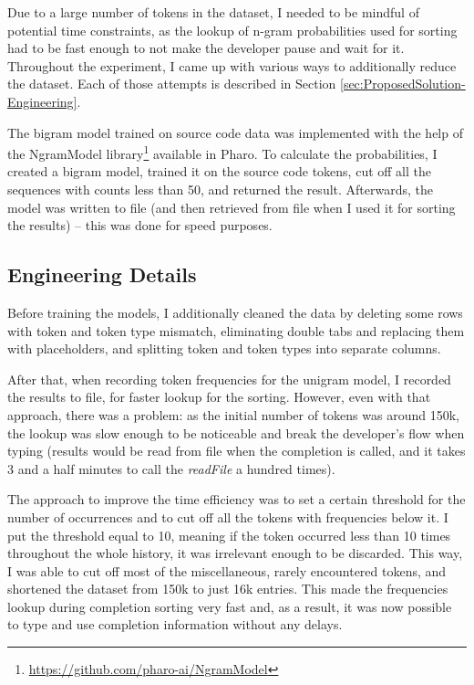 \documentclass[sigplan,screen]{acmart}
\begin{document}
Due to a large number of tokens in the dataset, I needed to be mindful of potential time constraints, as the lookup of n-gram probabilities used for sorting had to be fast enough to not make the developer pause and wait for it. Throughout the experiment, I came up with various ways to additionally reduce the dataset. Each of those attempts is described in Section \ref{sec:ProposedSolution-Engineering}.

The bigram model trained on source code data was implemented with the help of the NgramModel library\footnote{\url{https://github.com/pharo-ai/NgramModel}} available in Pharo. To calculate the probabilities, I created a bigram model, trained it on the source code tokens, cut off all the sequences with counts less than 50, and returned the result. Afterwards, the model was written to file (and then retrieved from file when I used it for sorting the results) -- this was done for speed purposes.

\subsection{Engineering Details}
Before training the models, I additionally cleaned the data by deleting some rows with token and token type mismatch, eliminating double tabs and replacing them with placeholders, and splitting token and token types into separate columns.

After that, when recording token frequencies for the unigram model, I recorded the results to file, for faster lookup for the sorting. However, even with that approach, there was a problem: as the initial number of tokens was around 150k, the lookup was slow enough to be noticeable and break the developer's flow when typing (results would be read from file when the completion is called, and it takes 3 and a half minutes to call the \textit{readFile} a hundred times).

The approach to improve the time efficiency was to set a certain threshold for the number of occurrences and to cut off all the tokens with frequencies below it. I put the threshold equal to 10, meaning if the token occurred less than 10 times throughout the whole history, it was irrelevant enough to be discarded. This way, I was able to cut off most of the miscellaneous, rarely encountered tokens, and shortened the dataset from 150k to just 16k entries. This made the frequencies lookup during completion sorting very fast and, as a result, it was now possible to type and use completion information without any delays.
\end{document}
